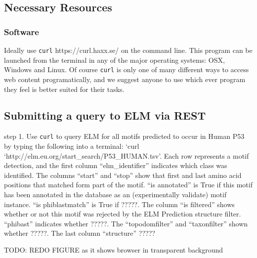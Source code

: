 \subsection{Necessary Resources}\label{necessary-resources-2}

\subsubsection{Software}\label{software}

Ideally use \texttt{curl} https://curl.haxx.se/ on the command line.
This program can be launched from the terminal in any of the major
operating systems: OSX, Windows and Linux. Of course \texttt{curl} is
only one of many different ways to access web content programatically,
and we suggest anyone to use which ever program they feel is better
suited for their tasks.

\subsection{Submitting a query to ELM via
REST}\label{submitting-a-query-to-elm-via-rest}

step 1. Use \texttt{curl} to query ELM for all motifs predicted to occur
in Human P53 by typing the following into a terminal: `curl
`http://elm.eu.org/start\_search/P53\_HUMAN.tsv'. Each row represents a
motif detection, and the first column ``elm\_identifier'' indicates
which class was identified. The columns ``start'' and ``stop'' show that
first and last amino acid positions that matched form part of the motif.
``is annotated'' is True if this motif has been annotated in the
database as an (experimentally validate) motif instance. ``is
phiblastmatch'' is True if ?????. The column ``is filtered'' shows
whether or not this motif was rejected by the ELM Prediction structure
filter. ``phibast'' indicates whether ?????. The ``topodomfilter'' and
``taxonfilter'' shown whether ?????. The last column ``structure'' ?????


TODO: REDO FIGURE as it shows browser in transparent background

